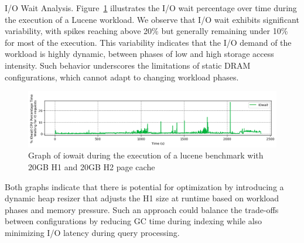 I/O Wait Analysis. Figure~\ref{fig:iowait} illustrates the I/O wait percentage over time during the execution of a Lucene workload. We observe that 
I/O wait exhibits significant variability, with spikes reaching above 20\% but generally remaining under 10\% for most of the 
execution. This variability indicates that the I/O demand of the workload is highly dynamic, between phases of low and high storage access 
intensity. Such behavior underscores the limitations of static DRAM configurations,
which cannot adapt to changing workload phases. 


\begin{figure}[htbp]
  \centering
  \includegraphics[width=1\columnwidth]{fig/iow_cpu.png}
  \caption{Graph of iowait during the execution of a lucene benchmark with 20GB H1 and 20GB H2 page cache}
  \label{fig:iowait}
\end{figure}

Both graphs indicate that there is potential for optimization by introducing a dynamic heap resizer that adjusts the H1 size at runtime based on workload phases and memory pressure. Such an approach could balance the trade-offs between configurations by reducing GC time during indexing while also minimizing I/O latency during query processing. 
